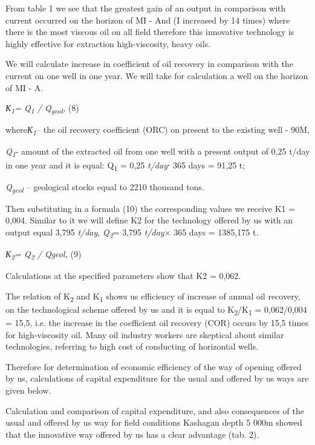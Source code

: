 From table 1 we see that the greatest gain of an output in comparison
with current occurred on the horizon of MI - And (I increased by 14
times) where there is the most viscous oil on all field therefore this
innovative technology is highly effective for extraction high-viscosity,
heavy oils.

We will calculate increase in coefficient of oil recovery in comparison
with the current on one well in one year. We will take for calculation a
well on the horizon of MI - A.

\emph{К\textsubscript{1}= Q\textsubscript{1} / Q\textsubscript{geol},}
(8)

where\emph{К\textsubscript{1}}-- the oil recovery coefficient (ORC) on
present to the existing well - 90M,

\emph{Q\textsubscript{1}}- amount of the extracted oil from one well
with a present output of 0,25 t/day in one year and it is equal:
Q\textsubscript{1} = 0,25 \emph{t/day}⋅ 365 days = 91,25 t;

\emph{Q\textsubscript{geol}} -- geological stocks equal to 2210 thousand
tons.

Then substituting in a formula (10) the corresponding values we receive
K1 = 0,004. Similar to it we will define K2 for the technology offered
by us with an output equal 3,795 \emph{t/day},
\emph{Q\textsubscript{2}}= 3,795 \emph{t/day}× 365 days = 1385,175
t\emph{.}

\emph{К\textsubscript{2}= Q\textsubscript{2} / Qgeol,} (9)

Calculations at the specified parameters show that K2 = 0,062.

The relation of K\textsubscript{2} and K\textsubscript{1} shows us
efficiency of increase of annual oil recovery, on the technological
scheme offered by us and it is equal to
K\textsubscript{2}/K\textsubscript{1} = 0,062/0,004 = 15,5, i.e. the
increase in the coefficient oil recovery (COR) occurs by 15,5 times for
high-viscosity oil. Many oil industry workers are skeptical about
similar technologies, referring to high cost of conducting of horizontal
wells.

Therefore for determination of economic efficiency of the way of opening
offered by us, calculations of capital expenditure for the usual and
offered by us ways are given below.

Calculation and comparison of capital expenditure, and also consequences
of the usual and offered by us way for field conditions Kashagan depth 5
000m showed that the innovative way offered by us has a clear advantage
(tab. 2).

